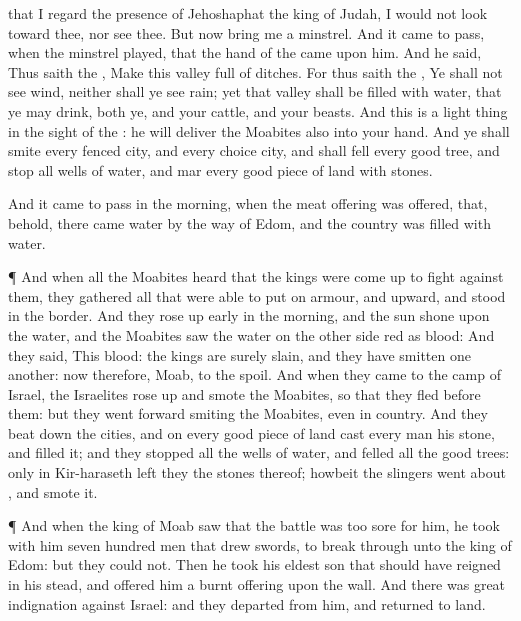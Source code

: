 {that I
regard the
presence of
Jehoshaphat the
king of
Judah, I would not
look toward thee, nor
see thee.
But now
bring me a
minstrel. And it came to pass, when the
minstrel
played, that the
hand of the
{} came upon him.
And he
said, Thus
saith the
{},
Make this
valley full of
ditches.
For thus
saith the
{}, Ye shall not
see
wind, neither shall ye
see
rain; yet that
valley shall be
filled with
water, that ye may
drink, both ye, and your
cattle, and your
beasts.
And this is
{} a light
thing in the
sight of the
{}: he will
deliver the
Moabites also into your
hand.
And ye shall
smite every
fenced
city, and every
choice
city, and shall
fell every
good
tree, and
stop all
wells of
water, and
mar every
good
piece of land with
stones.
\par }{\PP {}And it came to pass in the
morning, when the meat
offering was
offered, that, behold, there
came
water by the
way of
Edom, and the
country was
filled with
water.
\par }{\PP {}¶ And when all the
Moabites
heard that the
kings were come
up to
fight against them, they
gathered all that were able to
put on
armour, and
upward, and
stood in the
border.
And they rose up
early in the
morning, and the
sun
shone upon the
water, and the
Moabites
saw the
water on the other
side
{}
red as
blood:
And they
said, This
{}
blood: the
kings are
surely
slain, and they have
smitten
one
another: now therefore,
Moab, to the
spoil.
And when they
came to the
camp of
Israel, the
Israelites rose
up and
smote the
Moabites, so that they
fled
before them: but they went
forward
smiting the
Moabites, even in
{} country.
And they beat
down the
cities, and on every
good
piece of land
cast every
man his
stone, and
filled it; and they
stopped all the
wells of
water, and
felled all the
good
trees: only in
Kir-haraseth
left they the
stones thereof; howbeit the
slingers went
about
{}, and
smote it.
\par }{\PP {}¶ And when the
king of
Moab
saw that the
battle was too
sore for him, he
took with him
seven
hundred
men that
drew
swords, to break
through
{} unto the
king of
Edom: but they
could not.
Then he
took his
eldest
son that should have
reigned in his stead, and
offered him
{} a burnt
offering upon the
wall. And there was
great
indignation against
Israel: and they
departed from him, and
returned to
{}
land.

}
